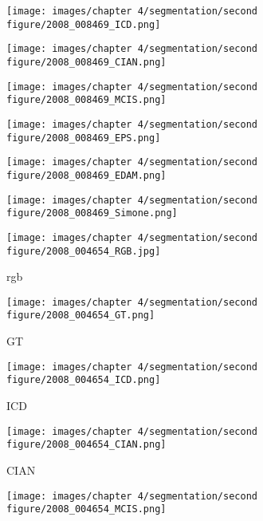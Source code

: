 \documentclass[runningheads]{styles/llncs}
\begin{document}
\begin{figure}[t]
\begin{subfigure}[b]{.11\linewidth}
\end{subfigure}
\begin{subfigure}[b]{.11\linewidth}
\texttt{[image: images/chapter 4/segmentation/second figure/2008\_008469\_ICD.png]}
\end{subfigure}
\begin{subfigure}[b]{.11\linewidth}
\texttt{[image: images/chapter 4/segmentation/second figure/2008\_008469\_CIAN.png]}
\end{subfigure}
\begin{subfigure}[b]{.11\linewidth}
\texttt{[image: images/chapter 4/segmentation/second figure/2008\_008469\_MCIS.png]}
\end{subfigure}
\begin{subfigure}[b]{.11\linewidth}
\texttt{[image: images/chapter 4/segmentation/second figure/2008\_008469\_EPS.png]}
\end{subfigure}
\begin{subfigure}[b]{.11\linewidth}
\texttt{[image: images/chapter 4/segmentation/second figure/2008\_008469\_EDAM.png]}
\end{subfigure}
\begin{subfigure}[b]{.11\linewidth}
\texttt{[image: images/chapter 4/segmentation/second figure/2008\_008469\_Simone.png]}
\end{subfigure}
\begin{subfigure}[b]{.11\linewidth}
\texttt{[image: images/chapter 4/segmentation/second figure/2008\_004654\_RGB.jpg]}
\caption{rgb}\label{fig:dola}
\end{subfigure}
\begin{subfigure}[b]{.11\linewidth}
\texttt{[image: images/chapter 4/segmentation/second figure/2008\_004654\_GT.png]}
\caption{GT}\label{fig:dolb}
\end{subfigure}
\begin{subfigure}[b]{.11\linewidth}
\texttt{[image: images/chapter 4/segmentation/second figure/2008\_004654\_ICD.png]}
\caption{ICD}\label{fig:dolc}
\end{subfigure}
\begin{subfigure}[b]{.11\linewidth}
\texttt{[image: images/chapter 4/segmentation/second figure/2008\_004654\_CIAN.png]}
\caption{CIAN}\label{fig:dold}
\end{subfigure}
\begin{subfigure}[b]{.11\linewidth}
\texttt{[image: images/chapter 4/segmentation/second figure/2008\_004654\_MCIS.png]}

\end{subfigure}
\end{figure}
\end{document}
